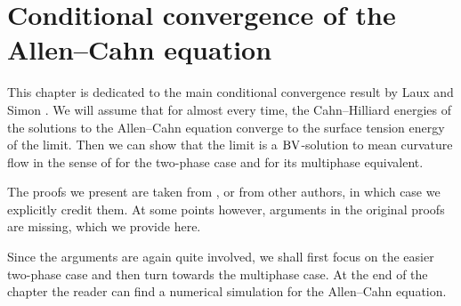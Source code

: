 \chapter{Conditional convergence of the Allen--Cahn equation}
\label{chapter_conditional_convergence_of_ac}

This chapter is dedicated to the main conditional convergence result by Laux 
and Simon 
\cite{convergence_of_allen_cahn_equation_to_multiphase_mean_curvature_flow}.
We will assume that for almost every time, the 
Cahn--Hilliard energies of the solutions to the Allen--Cahn equation converge 
to the surface tension energy of the limit. Then we can show that the limit is 
a $ \operatorname{BV} 
$-solution to mean curvature flow in the sense of  for the 
two-phase case and  for its multiphase equivalent.

The proofs we present are taken from 
\cite{convergence_of_allen_cahn_equation_to_multiphase_mean_curvature_flow}, 
or from other authors, 
in which case we explicitly credit them. At some points however, arguments 
in the original proofs are missing, which we provide here.

Since the arguments are again quite involved, we shall first focus on the 
easier 
two-phase case and then turn towards the multiphase case.
At the end of the chapter the reader can find a numerical simulation for the 
Allen--Cahn equation. 




